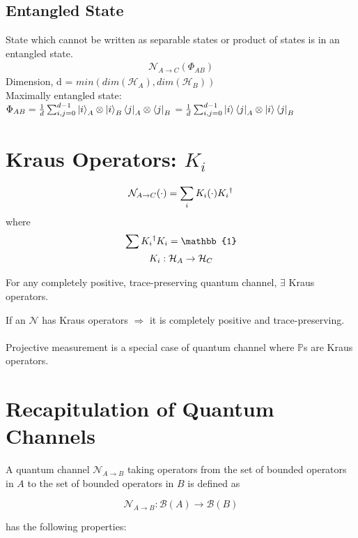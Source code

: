 \documentclass{article}
\begin{document}
\subsection{Entangled State}
State which cannot be written as separable states or product of states is in an entangled state.
\begin{gather*}
	\mathcal{N}_{A \rightarrow C}(\Phi _{AB})
\end{gather*}
Dimension, d = $min(dim(\mathcal{H}_{A}), dim(\mathcal{H}_{B}))$\\

Maximally entangled state: $\Phi_{AB} = \frac{1}{d} \sum_{i,j=0}^{d-1}\ket{i}_{A} \otimes \ket{i}_{B} \bra{j}_{A} \otimes \bra{j}_{B}\\
=\frac{1}{d} \sum_{i,j=0}^{d-1}\ket{i} \bra{j}_{A} \otimes \ket{i} \bra{j}_{B}
$

\section{Kraus Operators: $K_{i}$}
\begin{gather*}
	\mathcal{N}_{A \rightarrow C} (\cdot) = \sum_{i} K_{i}(\cdot) K_{i}\textsuperscript{\textdagger}
\end{gather*}
where
\begin{gather*}
	\sum K_{i}\textsuperscript{\textdagger} K_{i} =  \mathbb{1}\\
	K_{i} : \mathcal{H}_{A} \rightarrow{} \mathcal{H}_{C}
\end{gather*}

For any completely positive, trace-preserving quantum channel, $\exists$ Kraus operators.

If an $\mathcal{N}$ has Kraus operators $\Rightarrow{}$ it is completely positive and trace-preserving.
\\\\
Projective measurement is a special case of quantum channel where $\mathbb{P}$s are Kraus operators.
\section{Recapitulation of Quantum Channels}

A quantum channel $\mathcal{N}_{A \rightarrow B}$ taking operators from the set of bounded operators in $A$ to the set of bounded operators in $B$ is defined as

\[\mathcal{N}_{A \rightarrow B} : \mathcal{B}(A) \rightarrow \mathcal{B}(B)\]

has the following properties:
\end{document}
